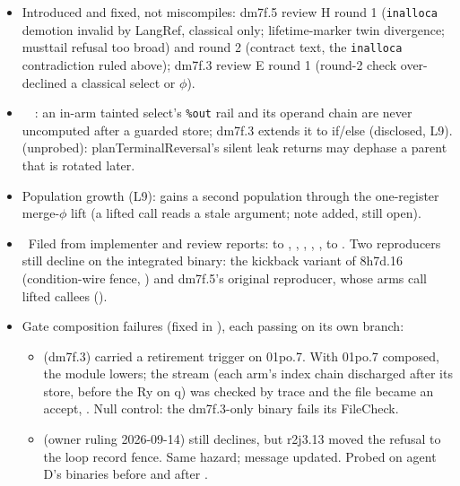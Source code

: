 \begin{itemize}
\begin{itemize}
    \item dm7f.4, review F round 1: a lifted-call condition left its result live at the
    kept-flag gate (wrong unitary behind the warning). Round 2: the kept flag was
    strippable when the compare reads only live records, so keeping it added a record the
    source does not have; the probe confirmed a wrong stream. Both fixed.
  \end{itemize}
  \item Introduced and fixed, not miscompiles: dm7f.5 review H round 1
  (\texttt{inalloca} demotion invalid by LangRef, classical only; lifetime-marker twin
  divergence; musttail refusal too broad) and round 2 (contract text, the
  \texttt{inalloca} contradiction ruled above); dm7f.3 review E round 1 (round-2 check
  over-declined a classical select or $\phi$).
  \item \fleak\ \fpreexisting\ : an in-arm tainted select's \texttt{\%out}
  rail and its operand chain are never uncomputed after a guarded store; dm7f.3 extends
  it to if/else (disclosed, L9).  (unprobed): planTerminalReversal's silent
  leak returns may dephase a parent that is rotated later.
  \item Population growth (L9):  gains a second population through the
  one-register merge-$\phi$ lift (a lifted call reads a stale argument; note added, still
  open).
  \item \foverdecline\ Filed from implementer and review reports:  to
  , , , , ,  to
  . Two reproducers still decline on the integrated binary: the kickback
  variant of 8h7d.16 (condition-wire fence, ) and dm7f.5's original
  reproducer, whose arms call lifted callees ().
  \item Gate composition failures (fixed in ), each passing on its own
  branch:
  \begin{itemize}
    \item {}\allowbreak{} (dm7f.3)
    carried a retirement trigger on 01po.7. With 01po.7 composed, the module lowers; the
    stream (each arm's index chain discharged after its store, before the Ry on q) was
    checked by trace and the file became an accept,
    \allowbreak{}. Null control: the
    dm7f.3-only binary fails its FileCheck.
    \item {}\allowbreak{} (owner
    ruling 2026-09-14) still declines, but r2j3.13 moved the refusal to the loop record
    fence. Same hazard; message updated. Probed on agent D's binaries before and after
    .
  \end{itemize}
\end{itemize}


